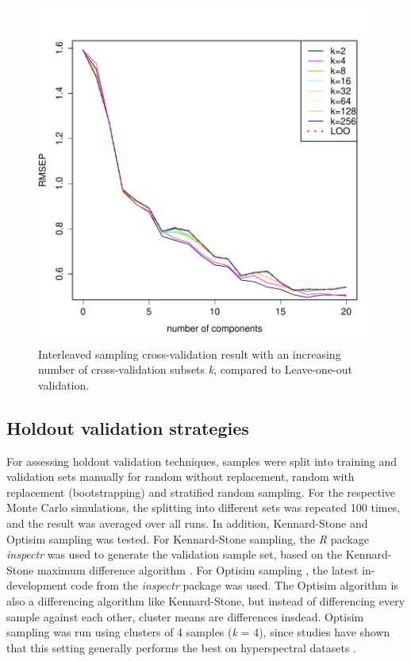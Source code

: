 \documentclass{isprs}
\begin{document}
\begin{figure}[ht!]
\includegraphics[width=1.0\columnwidth]{../script/output/interleaved-group-sizes.pdf}
\begin{center}
    \caption{Interleaved sampling cross-validation result with an increasing number of cross-validation subsets \textit{k}, compared to Leave-one-out validation.}
    \label{fig:interleaved-group-sizes}
\end{center}
\end{figure}

\subsection{Holdout validation strategies}\label{sec:Holdout validation strategies}

For assessing holdout validation techniques, samples were split into training and validation sets manually for random without replacement, random with replacement (bootstrapping) and stratified random sampling. For the respective Monte Carlo simulations, the splitting into different sets was repeated 100 times, and the result was averaged over all runs. In addition, Kennard-Stone and Optisim sampling was tested. For Kennard-Stone sampling, the \textit{R} package \textit{inspectr} was used to generate the validation sample set, based on the Kennard-Stone maximum difference algorithm \cite{kennard1969computer}. For Optisim sampling \cite{clark1997optisim}, the latest in-development code from the \textit{inspectr} package was used. The Optisim algorithm is also a differencing algorithm like Kennard-Stone, but instead of differencing every sample against each other, cluster means are differences insdead. Optisim sampling was run using clusters of 4 samples (\textit{k} = 4), since studies have shown that this setting generally performs the best on hyperspectral datasets \cite{clark2003boosted}.
\end{document}
